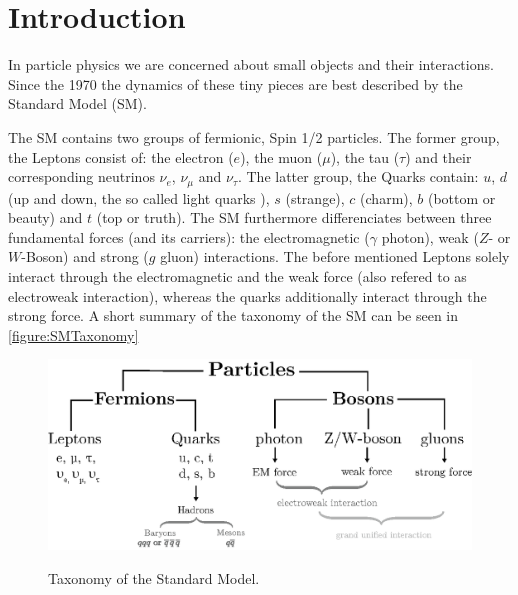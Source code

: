 \documentclass[../../index.tex]{subfiles}
\begin{document}
\chapter{Introduction}
In particle physics we are concerned about small objects and their interactions.
Since the 1970 the dynamics of these tiny pieces are best described by the Standard Model (SM).

The SM contains two groups of fermionic, Spin 1/2 particles. The former group,
the Leptons consist of: the electron ($e$), the muon ($\mu$), the tau ($\tau$)
and their corresponding neutrinos $\nu_e$, $\nu_\mu$ and $\nu_\tau$. The latter
group, the Quarks contain: $u$, $d$ (up and down, the so called light quarks ),
$s$ (strange), $c$ (charm), $b$ (bottom or beauty) and $t$ (top or truth). The SM
furthermore differenciates between three fundamental forces (and its carriers):
the electromagnetic ($\gamma$ photon), weak ($Z$- or $W$-Boson) and strong ($g$
gluon) interactions. The before mentioned Leptons solely interact through the
electromagnetic and the weak force (also refered to as electroweak interaction),
whereas the quarks additionally interact through the strong force. A short
summary of the taxonomy of the SM can be seen in \cref{figure:SMTaxonomy}
\begin{figure}
  \centering
  \includegraphics[width=\textwidth]{./images/standardModelTaxonomy.eps}
  \label{fig:SMTaxonomy}
  \caption{Taxonomy of the Standard Model.}
\end{figure}
\end{document}
